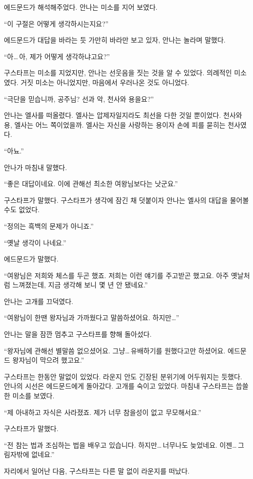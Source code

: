 에드문드가 해석해주었다. 안나는 미소를 지어 보였다.

``이 구절은 어떻게 생각하시는지요?''

에드문드가 대답을 바라는 듯 가만히 바라만 보고 있자, 안나는 놀라며 말했다.

``아\ldots\,아, 제가 어떻게 생각하냐고요?''

구스타프는 미소를 지었지만, 안나는 선웃음을 짓는 것을 알 수 있었다. 의례적인 미소였다. 거짓 미소는 아니었지만, 마음에서 우러나온 것도 아니었다.

``극단을 믿습니까, 공주님? 선과 악, 천사와 용을요?''

안나는 엘사를 떠올렸다. 엘사는 압제자일지라도 최선을 다한 것일 뿐이었다. 천사와 용, 엘사는 어느 쪽이었을까. 엘사는 자신을 사랑하는 용이자 손에 피를 묻히는 천사였다.

``아뇨.''

안나가 마침내 말했다.

``좋은 대답이네요. 이에 관해선 최소한 여왕님보다는 낫군요.''

구스타프가 말했다. 구스타프가 생각에 잠긴 채 덧붙이자 안나는 엘사의 대답을 물어볼 수도 없었다.

``정의는 흑백의 문제가 아니죠.''

``옛날 생각이 나네요.''

에드문드가 말했다.

``여왕님은 저희와 체스를 두곤 했죠. 저희는 이런 얘기를 주고받곤 했고요. 아주 옛날처럼 느껴졌는데, 지금 생각해 보니 몇 년 안 됐네요.''

안나는 고개를 끄덕였다.

``여왕님이 한땐 왕자님과 가까웠다고 말씀하셨어요. 하지만\ldots''

안나는 말을 잠깐 멈추고 구스타프를 향해 돌아섰다.

``왕자님에 관해선 별말씀 없으셨어요. 그냥\ldots\,유배하기를 원했다고만 하셨어요. 에드문드 왕자님이 막으려 했고요.''

구스타프는 한동안 말없이 있었다. 라운지 안도 긴장된 분위기에 어두워지는 듯했다. 안나의 시선은 에드문드에게 돌아갔다. 고개를 숙이고 있었다. 마침내 구스타프는 씁쓸한 미소를 보였다.

``제 아내하고 자식은 사라졌죠. 제가 너무 참을성이 없고 무모해서요.''

구스타프가 말했다.

``전 참는 법과 조심하는 법을 배우고 있습니다. 하지만\ldots\,너무나도 늦었네요. 이젠\ldots\,그림자밖에 없네요.''

자리에서 일어난 다음, 구스타프는 다른 말 없이 라운지를 떠났다.

